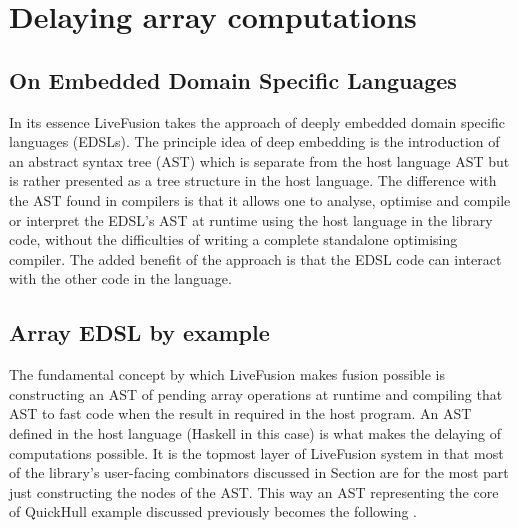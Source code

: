 \documentclass[preamble.tex]{subfiles}
\begin{document}
\clearpage

\chapter{Delaying array computations}

\section{On Embedded Domain Specific Languages}
In its essence LiveFusion takes the approach of deeply embedded domain specific languages (EDSLs). The principle idea of deep embedding is the introduction of an abstract syntax tree (AST) which is separate from the host language AST but is rather presented as a tree structure in the host language. The difference with the AST found in compilers is that it allows one to analyse, optimise and compile or interpret the EDSL's AST at runtime using the host language in the library code, without the difficulties of writing a complete standalone optimising compiler. The added benefit of the approach is that the EDSL code can interact with the other code in the language. 

\section{Array EDSL by example}
The fundamental concept by which LiveFusion makes fusion possible is constructing an AST of pending array operations at runtime and compiling that AST to fast code when the result in required in the host program. An AST defined in the host language (Haskell in this case) is what makes the delaying of computations possible. It is the topmost layer of LiveFusion system in that most of the library's user-facing combinators discussed in Section  are for the most part just constructing the nodes of the AST. This way an AST representing the core of QuickHull example discussed previously becomes the following .


\end{document}
